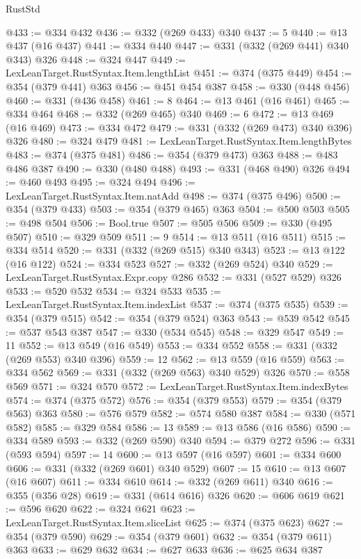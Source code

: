\begin{lexlean}{RustStd}
\begin{coremodule}
{\begin{coremodule}
{{{{{@433 := @334 @432
@436 := @332 (@269 @433) @340
@437 := 5
@440 := @13 @437 (@16 @437)
@441 := @334 @440
@447 := @331 (@332 (@269 @441) @340 @343) @326
@448 := @324 @447
@449 := LexLeanTarget.RustSyntax.Item.lengthList
@451 := @374 (@375 @449)
@454 := @354 (@379 @441) @363
@456 := @451 @454 @387
@458 := @330 (@448 @456)
@460 := @331 (@436 @458)
@461 := 8
@464 := @13 @461 (@16 @461)
@465 := @334 @464
@468 := @332 (@269 @465) @340
@469 := 6
@472 := @13 @469 (@16 @469)
@473 := @334 @472
@479 := @331 (@332 (@269 @473) @340 @396) @326
@480 := @324 @479
@481 := LexLeanTarget.RustSyntax.Item.lengthBytes
@483 := @374 (@375 @481)
@486 := @354 (@379 @473) @363
@488 := @483 @486 @387
@490 := @330 (@480 @488)
@493 := @331 (@468 @490) @326
@494 := @460 @493
@495 := @324 @494
@496 := LexLeanTarget.RustSyntax.Item.natAdd
@498 := @374 (@375 @496)
@500 := @354 (@379 @433)
@503 := @354 (@379 @465) @363
@504 := @500 @503
@505 := @498 @504
@506 := Bool.true
@507 := @505 @506
@509 := @330 (@495 @507)
@510 := @329 @509
@511 := 9
@514 := @13 @511 (@16 @511)
@515 := @334 @514
@520 := @331 (@332 (@269 @515) @340 @343)
@523 := @13 @122 (@16 @122)
@524 := @334 @523
@527 := @332 (@269 @524) @340
@529 := LexLeanTarget.RustSyntax.Expr.copy @286
@532 := @331 (@527 @529) @326
@533 := @520 @532
@534 := @324 @533
@535 := LexLeanTarget.RustSyntax.Item.indexList
@537 := @374 (@375 @535)
@539 := @354 (@379 @515)
@542 := @354 (@379 @524) @363
@543 := @539 @542
@545 := @537 @543 @387
@547 := @330 (@534 @545)
@548 := @329 @547
@549 := 11
@552 := @13 @549 (@16 @549)
@553 := @334 @552
@558 := @331 (@332 (@269 @553) @340 @396)
@559 := 12
@562 := @13 @559 (@16 @559)
@563 := @334 @562
@569 := @331 (@332 (@269 @563) @340 @529) @326
@570 := @558 @569
@571 := @324 @570
@572 := LexLeanTarget.RustSyntax.Item.indexBytes
@574 := @374 (@375 @572)
@576 := @354 (@379 @553)
@579 := @354 (@379 @563) @363
@580 := @576 @579
@582 := @574 @580 @387
@584 := @330 (@571 @582)
@585 := @329 @584
@586 := 13
@589 := @13 @586 (@16 @586)
@590 := @334 @589
@593 := @332 (@269 @590) @340
@594 := @379 @272
@596 := @331 (@593 @594)
@597 := 14
@600 := @13 @597 (@16 @597)
@601 := @334 @600
@606 := @331 (@332 (@269 @601) @340 @529)
@607 := 15
@610 := @13 @607 (@16 @607)
@611 := @334 @610
@614 := @332 (@269 @611) @340
@616 := @355 (@356 @28)
@619 := @331 (@614 @616) @326
@620 := @606 @619
@621 := @596 @620
@622 := @324 @621
@623 := LexLeanTarget.RustSyntax.Item.sliceList
@625 := @374 (@375 @623)
@627 := @354 (@379 @590)
@629 := @354 (@379 @601)
@632 := @354 (@379 @611) @363
@633 := @629 @632
@634 := @627 @633
@636 := @625 @634 @387
}}}}}
\end{coremodule}}
\end{coremodule}
\end{lexlean}
